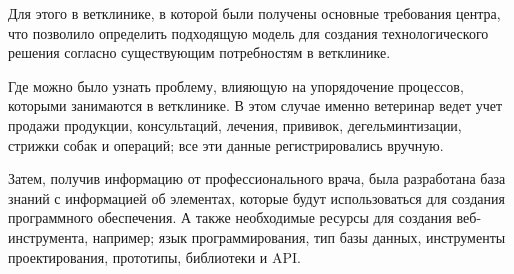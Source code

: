 Для этого в ветклинике, в которой были получены основные требования центра, что позволило определить подходящую модель для создания технологического решения согласно существующим потребностям в ветклинике.

Где можно было узнать проблему, влияющую на упорядочение процессов, которыми занимаются в ветклинике. В этом случае именно ветеринар ведет учет продажи продукции, консультаций, лечения, прививок, дегельминтизации, стрижки собак и операций; все эти данные регистрировались вручную.

Затем, получив информацию от профессионального врача, была разработана база знаний с информацией об элементах, которые будут использоваться для создания программного обеспечения. А также необходимые ресурсы для создания веб-инструмента, например; язык программирования, тип базы данных, инструменты проектирования, прототипы, библиотеки и API.
